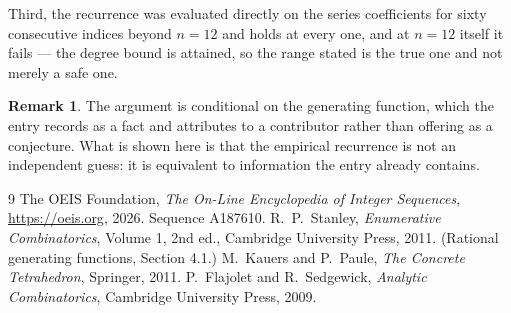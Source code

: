 \documentclass[11pt,a4paper]{article}
\theoremstyle{plain}
\theoremstyle{definition}
\newtheorem{remark}[theorem]{Remark}
\begin{document}
Third, the recurrence was evaluated directly on the series coefficients for sixty consecutive
indices beyond $n=12$ and holds at every one, and at $n=12$ itself it fails --- the
degree bound is attained, so the range stated is the true one and not merely a safe one.

\begin{remark}
The argument is conditional on the generating function, which the entry records as a fact and
attributes to a contributor rather than offering as a conjecture. What is shown here is that
the empirical recurrence is not an independent guess: it is equivalent to information the
entry already contains.
\end{remark}

\begin{thebibliography}{9}
 The OEIS Foundation, \emph{The On-Line Encyclopedia of Integer
Sequences}, \url{https://oeis.org}, 2026. Sequence A187610.
 R.~P.~Stanley, \emph{Enumerative Combinatorics}, Volume 1, 2nd ed.,
Cambridge University Press, 2011. (Rational generating functions, Section 4.1.)
 M.~Kauers and P.~Paule, \emph{The Concrete Tetrahedron}, Springer, 2011.
 P.~Flajolet and R.~Sedgewick, \emph{Analytic Combinatorics}, Cambridge
University Press, 2009.
\end{thebibliography}
\end{document}
